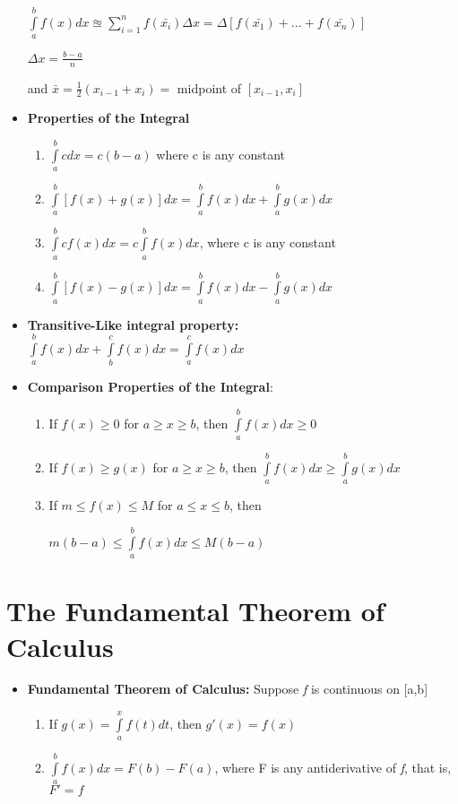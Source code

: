 \documentclass{report}
\begin{document}
\begin{itemize}
					\begin{center}
					$\int\limits_{a}^{b}f(x)dx\approxeq \sum\limits_{i=1}^{n}f(\bar{x_i})\Delta x=\Delta [f(\bar{x_1})+...+f(\bar{x_n})]$
					\end{center}
					\begin{center}
					$\Delta x =\frac{b-a}{n}$
					\end{center}
					\begin{center}
					and $\bar{x}=\frac{1}{2}(x_{i-1}+x_i)=$ midpoint of $[x_{i-1},x_i]$
					\end{center}
					\newpage
				\item \textbf{Properties of the Integral} 
				\begin{enumerate}\addtolength{\leftskip}{4em}
					\item $\int\limits_{a}^{b}cdx=c(b-a)$ where c is any constant
					\item $\int\limits_{a}^{b}[f(x)+g(x)]dx=\int\limits_{a}^{b}f(x)dx+\int\limits_{a}^{b}g(x)dx$
					\item $\int\limits_{a}^{b}cf(x)dx=c\int\limits_{a}^{b}f(x)dx$, where c is any constant
					\item $\int\limits_{a}^{b}[f(x)-g(x)]dx=\int\limits_{a}^{b}f(x)dx-\int\limits_{a}^{b}g(x)dx$
				\end{enumerate} 
				\item \textbf{Transitive-Like integral property:} $\int\limits_{a}^{b}f(x)dx+\int\limits_{b}^{c}f(x)dx=\int\limits_{a}^{c}f(x)dx$
				\item \textbf{Comparison Properties of the Integral}:
				\begin{enumerate}\addtolength{\leftskip}{4em}
				\item If $f(x)\ge 0$ for $a\ge x \ge b$, then $\int\limits_{a}^{b}f(x)dx\ge 0$
				\item If $f(x)\ge g(x)$ for $a\ge x \ge b$, then $\int\limits_{a}^{b}f(x)dx\ge \int\limits_{a}^{b}g(x)dx$
				\item If $m\le f(x)\le M$ for $a\le x \le b$, then 
					\begin{center}
					$m(b-a)\le \int\limits_{a}^{b}f(x)dx\le M(b-a)$
					\end{center}
				\end{enumerate}
			\end{itemize} 
		\section{The Fundamental Theorem of Calculus}
			\begin{itemize}\addtolength{\leftskip}{2em}
				\item \textbf{Fundamental Theorem of Calculus:} Suppose \textit{f} is continuous on [a,b]
				\begin{enumerate}\addtolength{\leftskip}{4em}
				\item If $g(x)=\int\limits_{a}^{x}f(t)dt$, then $g'(x)=f(x)$
				\item $\int\limits_{a}^{b}f(x)dx=F(b)-F(a)$, where F is any antiderivative of \textit{f}, that is, $F'=f$
				\end{enumerate}
			\end{itemize}
			\newpage
\end{document}
